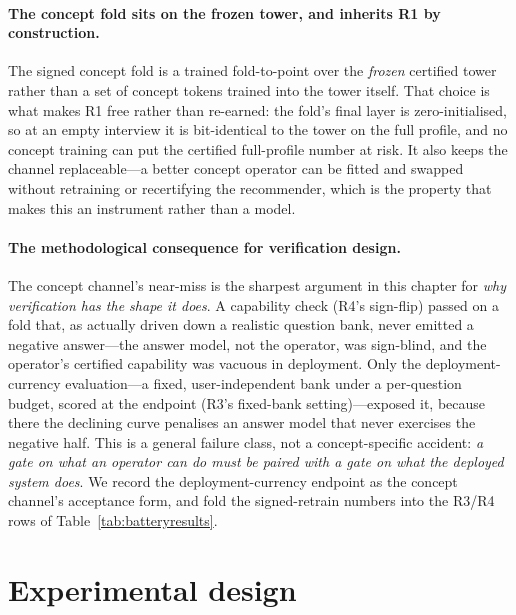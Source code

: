 \documentclass[11pt]{article}
\begin{document}
\paragraph{The concept fold sits on the frozen tower, and inherits R1 by construction.} The signed concept fold is a
trained fold-to-point over the \emph{frozen} certified tower rather than a set of concept tokens trained into the
tower itself. That choice is what makes R1 free rather than re-earned: the fold's final layer is zero-initialised,
so at an empty interview it is bit-identical to the tower on the full profile, and no concept training can put the
certified full-profile number at risk. It also keeps the channel replaceable---a better concept operator can be
fitted and swapped without retraining or recertifying the recommender, which is the property that makes this an
instrument rather than a model.

\paragraph{The methodological consequence for verification design.} The concept channel's near-miss is the sharpest
argument in this chapter for \emph{why verification has the shape it does}. A capability check (R4's sign-flip) passed on
a fold that, as actually driven down a realistic question bank, never emitted a negative answer---the answer model, not
the operator, was sign-blind, and the operator's certified capability was vacuous in deployment. Only the
deployment-currency evaluation---a fixed, user-independent bank under a per-question budget, scored at the endpoint
(R3's fixed-bank setting)---exposed it, because there the declining curve penalises an answer model that
never exercises the negative half. This is a general failure class, not a concept-specific accident: \emph{a gate on
what an operator \emph{can} do must be paired with a gate on what the deployed system \emph{does}}. We record the
deployment-currency endpoint as the concept channel's acceptance form, and fold the signed-retrain numbers into
the R3/R4 rows of Table~\ref{tab:batteryresults}.

\section{Experimental design}\label{sec:expdesign}
\end{document}
